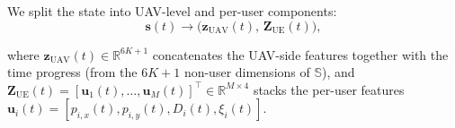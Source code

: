 \documentclass[journal]{IEEEtran}
\begin{document}
We split the state into UAV-level and per-user components:
\begin{equation}\label{eq:decompose}
  \bm{s}(t) \rightarrow
  \bigl(\bm{z}_{\mathrm{UAV}}(t),\, 
        \bm{Z}_{\mathrm{UE}}(t)\bigr),
\end{equation}

where $\bm{z}_{\mathrm{UAV}}(t) \in \mathbb{R}^{6K+1}$ 
concatenates the UAV-side features together with the time 
progress (from the $6K + 1$ non-user dimensions of $\mathbb{S}$), 
and $\bm{Z}_{\mathrm{UE}}(t) = 
[\bm{u}_1(t), \ldots, \bm{u}_M(t)]^{\top} 
\in \mathbb{R}^{M \times 4}$ stacks the per-user features 
$\bm{u}_i(t) = [p_{i,x}(t), p_{i,y}(t), D_i(t), \xi_i(t)]$.

\end{document}
